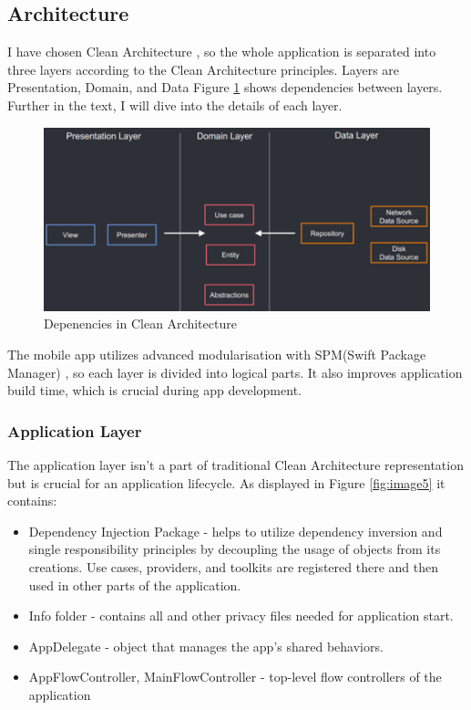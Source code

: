 \documentclass[
  biblatex = false,
  language=english,
  figures=false,
  sourcecodes,
  glossaries,
  index
]{kidiplom}
\begin{document}
\subsection{Architecture}
I have chosen Clean Architecture \cite{bib7}, so the whole application is separated into three layers according to the Clean Architecture principles. Layers are Presentation, Domain, and Data Figure \ref{fig:image4} shows dependencies between layers. Further in the text, I will dive into the details of each layer.

\begin{figure}[h!]
\centering
\includegraphics[width=15cm]{image4}
\caption{Depenencies in Clean Architecture}
\label{fig:image4}
\end{figure}

The mobile app utilizes advanced modularisation with SPM(Swift Package Manager) \cite{bib8}, so each layer is divided into logical parts. It also improves application build time, which is crucial during app development.

\subsubsection{Application Layer}
The application layer isn't a part of traditional Clean Architecture representation but is crucial for an application lifecycle. As displayed in Figure \ref{fig:image5} it contains:
\begin{itemize}
	\item Dependency Injection Package - helps to utilize dependency inversion and single responsibility principles by decoupling the usage of objects from its creations. Use cases, providers, and toolkits are registered there and then used in other parts of the application.
	\item Info folder - contains all  and other privacy files needed for application start.
	\item AppDelegate - object that manages the app's shared behaviors.
	\item AppFlowController, MainFlowController - top-level flow controllers of the application
\end{itemize}
\end{document}

